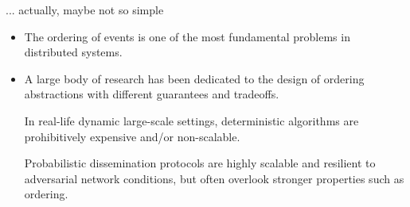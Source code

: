 
\begin{frame}{... actually, maybe not so simple}
  
  \begin{itemize}

  \item The ordering of events is one of the most fundamental problems in distributed systems.

  \item A large body of research has been dedicated to the design of ordering abstractions with different guarantees and tradeoffs.

\vspace{5mm}

  \begin{snugshade}
            \begin{center}
  In real-life dynamic large-scale settings, deterministic algorithms are prohibitively expensive and/or non-scalable.
   \end{center}
  \end{snugshade}  

 \begin{snugshade}
            \begin{center}
Probabilistic dissemination protocols are highly scalable and resilient to adversarial network conditions, but often overlook stronger properties such as ordering.
   \end{center}
  \end{snugshade}

  
\end{itemize}

\end{frame}


